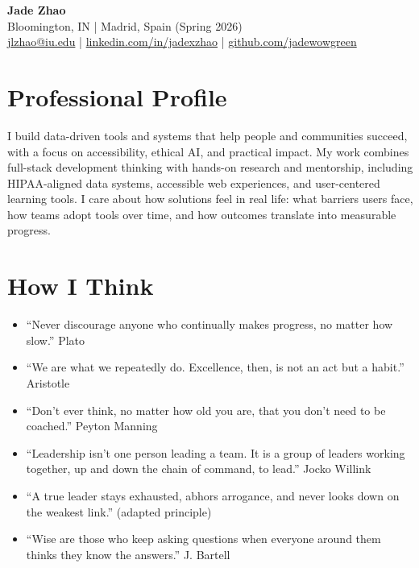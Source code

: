\documentclass[11pt]{article}
\begin{document}
\begin{center}
    {\LARGE \textbf{Jade Zhao}}\\
    \vspace{0.25em}
    {\small Bloomington, IN \;|\; Madrid, Spain (Spring 2026)}\\
    \vspace{0.25em}
    {\small
      \href{mailto:jlzhao@iu.edu}{jlzhao@iu.edu}
      \;|\;
      \href{https://linkedin.com/in/jadexzhao}{linkedin.com/in/jadexzhao}
      \;|\;
      \href{https://github.com/jadewowgreen}{github.com/jadewowgreen}
    }
    \vspace{0.25em}
\end{center}

\vspace{0.75em}

\section*{Professional Profile}
I build data-driven tools and systems that help people and communities succeed, with a focus on accessibility, ethical AI, and practical impact. My work combines full-stack development thinking with hands-on research and mentorship, including HIPAA-aligned data systems, accessible web experiences, and user-centered learning tools. I care about how solutions feel in real life: what barriers users face, how teams adopt tools over time, and how outcomes translate into measurable progress.

\section*{How I Think}
\begin{itemize}[leftmargin=*]
    \item ``Never discourage anyone who continually makes progress, no matter how slow.'' Plato
    \item ``We are what we repeatedly do. Excellence, then, is not an act but a habit.'' Aristotle
    \item ``Don't ever think, no matter how old you are, that you don't need to be coached.'' Peyton Manning
    \item ``Leadership isn't one person leading a team. It is a group of leaders working together, up and down the chain of command, to lead.'' Jocko Willink
    \item ``A true leader stays exhausted, abhors arrogance, and never looks down on the weakest link.'' (adapted principle)
    \item ``Wise are those who keep asking questions when everyone around them thinks they know the answers.'' J. Bartell
\end{itemize}
\end{document}
